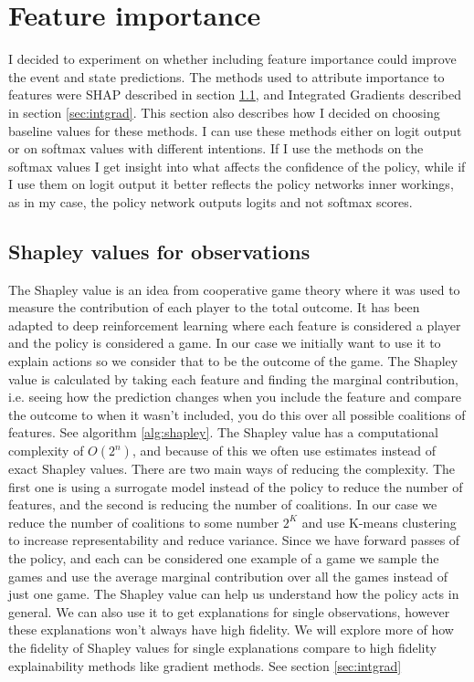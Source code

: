 \documentclass[UKenglish]{uiomasterthesis}
\begin{document}
\section{Feature importance}
\label{sec:feat_imp_meth}
I decided to experiment on whether including feature importance could improve the event and state predictions. The methods used to attribute importance to features were SHAP described in section \ref{sec:shap_meth}, and Integrated Gradients described in section \ref{sec:intgrad}. This section also describes how I decided on choosing baseline values for these methods.
I can use these methods either on logit output or on softmax values with different intentions. If I use the methods on the softmax values I get insight into what affects the confidence of the policy, while if I use them on logit output it better reflects the policy networks inner workings, as in my case, the policy network outputs logits and not softmax scores.

\subsection{Shapley values for observations}
\label{sec:shap_meth}
The Shapley value is an idea from cooperative game theory where it was used to measure the contribution of each player to the total outcome. It has been adapted to deep reinforcement learning where each feature is considered a player and the policy is considered a game. In our case we initially want to use it to explain actions so we consider that to be the outcome of the game. The Shapley value is calculated by taking each feature and finding the marginal contribution, i.e. seeing how the prediction changes when you include the feature and compare the outcome to when it wasn't included, you do this over all possible coalitions of features. See algorithm \ref{alg:shapley}.
The Shapley value has a computational complexity of $O(2^n)$, and because of this we often use estimates instead of exact Shapley values. There are two main ways of reducing the complexity. The first one is using a surrogate model instead of the policy to reduce the number of features, and the second is reducing the number of coalitions. In our case we reduce the number of coalitions to some number $2^K$ and use K-means clustering to increase representability and reduce variance.
Since we have forward passes of the policy, and each can be considered one example of a game we sample the games and use the average marginal contribution over all the games instead of just one game.
The Shapley value can help us understand how the policy acts in general. We can also use it to get explanations for single observations, however these explanations won't always have high fidelity. We will explore more of how the fidelity of Shapley values for single explanations compare to high fidelity explainability methods like gradient methods. See section \ref{sec:intgrad}
\end{document}
